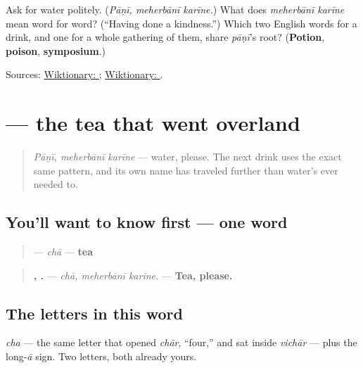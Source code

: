\begin{tcolorbox}[breakable,colback=teal!4,colframe=teal!35!black,title={Before you move on}]
Ask for water politely. (\emph{Pāṇī, meherbānī karīne.}) What does \emph{meherbānī karīne} mean word for word? (\textquotedblleft{}Having done a kindness.\textquotedblright{}) Which two English words for a drink, and one for a whole gathering of them, share \emph{pāṇī}'s root? (\textbf{Potion}, \textbf{poison}, \textbf{symposium}.)

Sources: \href{https://en.wiktionary.org/wiki/\%E0\%AA\%AA\%E0\%AA\%BE\%E0\%AA\%A3\%E0\%AB\%80}{Wiktionary: }; \href{https://en.wiktionary.org/wiki/\%E0\%AA\%AE\%E0\%AA\%B9\%E0\%AB\%87\%E0\%AA\%B0\%E0\%AA\%AC\%E0\%AA\%BE\%E0\%AA\%A8\%E0\%AB\%80}{Wiktionary: }.
\end{tcolorbox}
\section[chā]{ — the tea that went overland}

\label{lesson:GU-C10-chaa}



\begin{quote}
\emph{Pāṇī, meherbānī karīne} — water, please. The next drink uses the exact same pattern, and its own name has traveled further than water's ever needed to.
\end{quote}

\subsection*{You'll want to know first — one word}
\begin{quote}
\textbf{} — \emph{chā} — \textbf{tea}
\end{quote}

\begin{quote}
\textbf{,  .} — \emph{chā, meherbānī karīne.} — \textbf{Tea, please.}
\end{quote}

\subsection*{The letters in this word}
\textbf{} \emph{cha} — the same letter that opened \emph{chār}, \textquotedblleft{}four,\textquotedblright{} and sat inside \emph{vichār} — plus the long-\emph{ā} sign. Two letters, both already yours.

